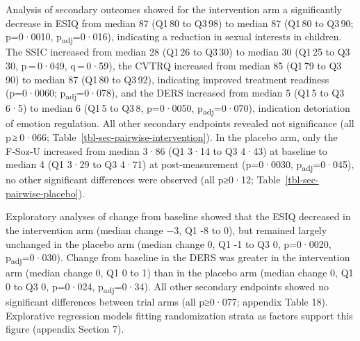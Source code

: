 \documentclass[
  super,
  preprint,
  1p,
  onecolumn]{elsarticle}
\begin{document}
\newpage{}

Analysis of secondary outcomes showed for the intervention arm a
significantly decrease in ESIQ from median 87 (Q1\,80 to Q3\,98) to
median 87 (Q1\,80 to Q3\,90; p=0·0010, p\textsubscript{adj}=0·016),
indicating a reduction in sexual interests in children. The SSIC
increased from median 28 (Q1\,26 to Q3\,30) to median 30 (Q1\,25 to
Q3\,30, p\,=\,0·049, q\,=\,0·59), the CVTRQ increased from median 85
(Q1\,79 to Q3\,90) to median 87 (Q1\,80 to Q3\,92), indicating improved
treatment readiness (p=0·0060; p\textsubscript{adj}=0·078), and the DERS
increased from median 5 (Q1\,5 to Q3\,6·5) to median 6 (Q1\,5 to Q3\,8,
p=0·0050, p\textsubscript{adj}=0·070), indication detoriation of emotion
regulation. All other secondary endpoints revealed not significance (all
p\,≥\,0·066; Table~\ref{tbl-sec-pairwise-intervention}). In the placebo
arm, only the F‑Soz‑U increased from median 3·86 (Q1 3·14 to Q3 4·43) at
baseline to median 4 (Q1 3·29 to Q3 4·71) at post‑measurement (p=0·0030,
p\textsubscript{adj}=0·045), no other significant differences were
observed (all p≥0·12; Table~\ref{tbl-sec-pairwise-placebo}).

Exploratory analyses of change from baseline showed that the ESIQ
decreased in the intervention arm (median change −3, Q1 -8 to 0), but
remained largely unchanged in the placebo arm (median change 0, Q1 -1 to
Q3 0, p=0·0020, p\textsubscript{adj}=0·030). Change from baseline in the
DERS was greater in the intervention arm (median change 0, Q1 0 to 1)
than in the placebo arm (median change 0, Q1 0 to Q3 0, p=0·024,
p\textsubscript{adj}=0·34). All other secondary endpoints showed no
significant differences between trial arms (all p≥0·077; appendix Table
18). Explorative regression models fitting randomization strata as
factors support this figure (appendix Section 7).

\newpage{}
\end{document}
